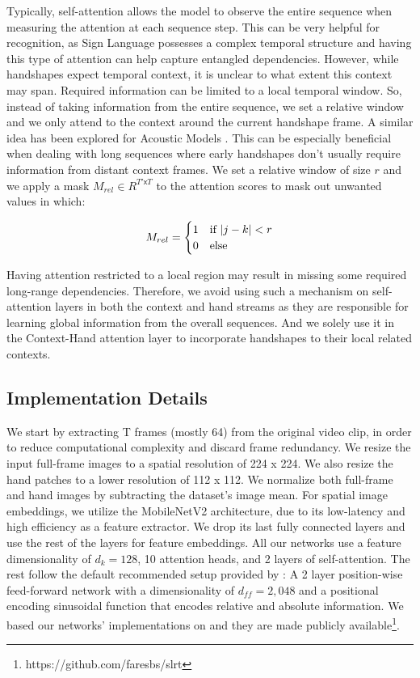 \documentclass[a4paper,conference]{IEEEtran}
\begin{document}
Typically, self-attention allows the model to observe the entire sequence when measuring the attention at each sequence step. This can be very helpful for recognition, as Sign Language possesses a complex temporal structure and having this type of attention can help capture entangled dependencies. However, while handshapes expect temporal context, it is unclear to what extent this context may span. Required information can be limited to a local temporal window. So, instead of taking information from the entire sequence, we set a relative window and we only attend to the context around the current handshape frame. A similar idea has been explored for Acoustic Models \cite{sperber2018self}. This can be especially beneficial when dealing with long sequences where early handshapes don't usually require information from distant context frames.  We set a relative window of size $r$ and we apply a mask $M_{rel}\in \!R^{T'\mathsf{x}T}$ to the attention scores to mask out unwanted values in which:
    
$$
M_{rel} = \begin{cases}
    1 & \text{if $ |j-k| < r$}\\
    0 & \text{else}\\
\end{cases}
$$
	
Having attention restricted to a local region may result in missing some required long-range dependencies. Therefore, we avoid using such a mechanism on self-attention layers in both the context and hand streams as they are responsible for learning global information from the overall sequences. And we solely use it in the Context-Hand attention layer to incorporate handshapes to their local related contexts. 

\subsection{Implementation Details}
We start by extracting T frames (mostly 64) from the original video clip, in order to reduce computational complexity and discard frame redundancy. We resize the input full-frame images to a spatial resolution of 224 x 224. We also resize the hand patches to a lower resolution of 112 x 112. We normalize both full-frame and hand images by subtracting the dataset's image mean. For spatial image embeddings, we utilize the MobileNetV2 \cite{sandler2018mobilenetv2} architecture, due to its low-latency and high efficiency as a feature extractor. We drop its last fully connected layers and use the rest of the layers for feature embeddings. All our networks use a feature dimensionality of $d_k = 128$, 10 attention heads, and 2 layers of self-attention. The rest follow the default recommended setup provided by \cite{vaswani2017attention}: A 2 layer position-wise feed-forward network with a dimensionality of $d_{ff} = 2,048$ and a positional encoding sinusoidal function that encodes relative and absolute information. We based our networks' implementations on \cite{opennmt} and they are made publicly available\footnote{https://github.com/faresbs/slrt}. 
\end{document}
